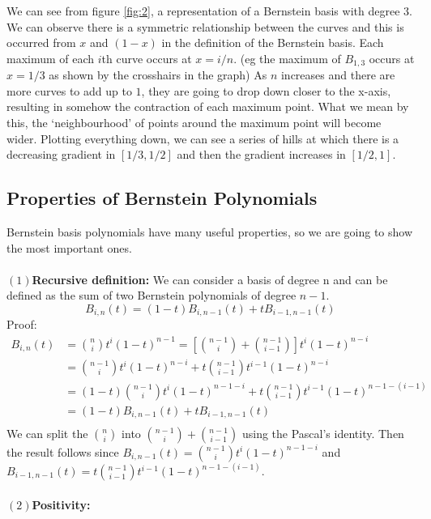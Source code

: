 \documentclass{article}
\begin{document}
\newpage
We can see from figure \ref{fig:2}, a representation of a Bernstein basis with degree $3$. We can observe there is a symmetric relationship between the curves and this is occurred from $x$ and $(1-x)$ in the definition of the Bernstein basis. Each maximum of each $i$th curve occurs at $x=i/n$. (eg the maximum of $B_{1,3}$ occurs at $x=1/3$ as shown by the crosshairs in the graph) As $n$ increases and there are more curves to add up to $1$, they are going to drop down closer to the x-axis, resulting in somehow the contraction of each maximum point. What we mean by this, the `neighbourhood' of points around the maximum point will become wider. Plotting everything down, we can see a series of hills at which there is a decreasing gradient in $[1/3, 1/2]$ and then the gradient increases in $[1/2, 1]$.
\subsection{Properties of Bernstein Polynomials}
Bernstein basis polynomials have many useful properties, so we are going to show the most important ones.\paragraph{}
$(1)$\textbf{Recursive definition:}
We can consider a basis of degree n and can be defined as the sum of two Bernstein polynomials of degree $n-1$.
\begin{equation}
B_{i,n}(t)=(1-t)B_{i,n-1}(t)+tB_{i-1,n-1}(t)    
\end{equation}
Proof:
\begin{align*}
B_{i,n}(t)&=\binom{n}{i}t^i(1-t)^{n-1}=\left[\binom{n-1}{i}+\binom{n-1}{i-1}\right]t^i(1-t)^{n-i}\\
&=\binom{n-1}{i}t^i(1-t)^{n-i}+t\binom{n-1}{i-1}t^{i-1}(1-t)^{n-i}\\
&=(1-t)\binom{n-1}{i}t^i(1-t)^{n-1-i}+t\binom{n-1}{i-1}t^{i-1}(1-t)^{n-1-(i-1)}\\
&=(1-t)B_{i,n-1}(t)+tB_{i-1,n-1}(t)\\
\end{align*}
We can split the $\binom{n}{i}$ into $\binom{n-1}{i}+\binom{n-1}{i-1}$ using the Pascal’s identity. Then the result follows since $B_{i,n-1}(t)=\binom{n-1}{i}t^i(1-t)^{n-1-i}$ and $B_{i-1,n-1}(t)=t\binom{n-1}{i-1}t^{i-1}(1-t)^{n-1-(i-1)}$.\paragraph{}
$(2)$\textbf{Positivity:}
\end{document}
